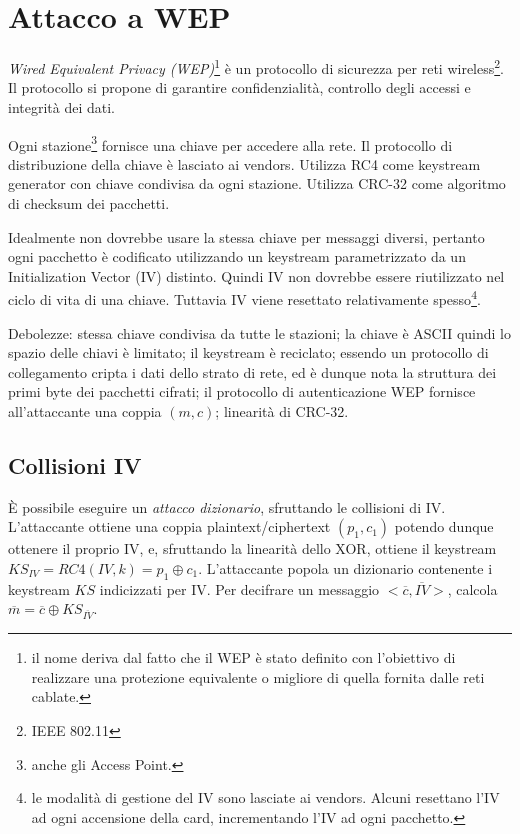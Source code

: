 \section{Attacco a WEP}
\textit{Wired Equivalent Privacy (WEP)}\footnote{il nome deriva dal fatto che il WEP è stato definito con l'obiettivo  di realizzare una protezione equivalente o migliore di quella fornita dalle reti cablate.} è un protocollo di sicurezza per reti wireless\footnote{IEEE 802.11}.
Il protocollo si propone di garantire confidenzialità, controllo degli accessi e integrità dei dati.

Ogni stazione\footnote{anche gli Access Point.} fornisce una chiave per accedere alla rete. Il protocollo di distribuzione della chiave è lasciato ai vendors.
Utilizza RC4 come keystream generator con chiave condivisa da ogni stazione.
Utilizza CRC-32 come algoritmo di checksum dei pacchetti.

Idealmente non dovrebbe usare la stessa chiave per messaggi diversi, pertanto ogni pacchetto è codificato utilizzando un keystream parametrizzato da un Initialization Vector (IV) distinto. Quindi IV non dovrebbe essere riutilizzato nel ciclo di vita di una chiave. Tuttavia IV viene resettato relativamente spesso\footnote{le modalità di gestione del IV sono lasciate ai vendors. Alcuni resettano l'IV ad ogni accensione della card, incrementando l'IV ad ogni pacchetto.}.

Debolezze: stessa chiave condivisa da tutte le stazioni; la chiave è ASCII quindi lo spazio delle chiavi è limitato; il keystream è reciclato; essendo un protocollo di collegamento cripta i dati dello strato di rete, ed è dunque nota la struttura dei primi byte dei pacchetti cifrati; il protocollo di autenticazione WEP fornisce all'attaccante una coppia $(m,c)$; linearità di CRC-32.


\subsection{Collisioni IV}
È possibile eseguire un \textit{attacco dizionario}, sfruttando le collisioni di IV.
L'attaccante ottiene una coppia plaintext/ciphertext $(p_{1},c_{1})$ potendo dunque ottenere il proprio IV, e, sfruttando la linearità dello XOR, ottiene il keystream $KS_{IV}=RC4(IV,k)=p_{1} \oplus c_{1}$.
L'attaccante popola un dizionario contenente i keystream $KS$ indicizzati per IV.
Per decifrare un messaggio $<\overline{c},\overline{IV}>$, calcola $\overline{m}=\overline{c} \oplus KS_{\overline{IV}}$.


